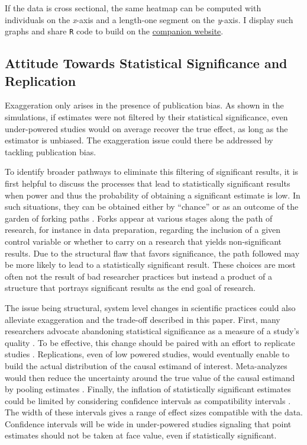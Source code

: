 \documentclass[usletter, 12pt]{article}
\begin{document}
				If the data is cross sectional, the same heatmap can be computed with individuals on the \textit{x}-axis and a length-one segment on the \textit{y}-axis. I display such graphs and share  \verb?R?  code to build on the \href{https://vincentbagilet.github.io/causal_exaggeration/}{companion website}.
				
				
	\subsection{Attitude Towards Statistical Significance and Replication}
	
		Exaggeration only arises in the presence of publication bias. As shown in the simulations, if estimates were not filtered by their statistical significance, even under-powered studies would on average recover the true effect, as long as the estimator is unbiased. The exaggeration issue could there be addressed by tackling publication bias. 
		
		To identify broader pathways to eliminate this filtering of significant results, it is first helpful to discuss the processes that lead to statistically significant results when power and thus the probability of obtaining a significant estimate is low. In such situations, they can be obtained either by ``chance'' or as an outcome of the garden of forking paths \citep{simmons_false-positive_2011, gelman_garden_2013, kasy_forking_2021}. Forks appear at various stages along the path of research, for instance in data preparation, regarding the inclusion of a given control variable or whether to carry on a research that yields non-significant results. Due to the structural flaw that favors significance, the path followed may be more likely to lead to a statistically significant result. These choices are most often not the result of bad researcher practices but instead a product of a structure that portrays significant results as the end goal of research. 
		
		The issue being structural, system level changes in scientific practices could also alleviate exaggeration and the trade-off described in this paper. First, many researchers advocate abandoning statistical significance as a measure of a study's quality \citep{mcshane_abandon_2019}. To be effective, this change should be paired with an effort to replicate studies \citep{christensen_transparency_2018}. Replications, even of low powered studies, would eventually enable to build the actual distribution of the causal estimand of interest. Meta-analyzes would then reduce the uncertainty around the true value of the causal estimand by pooling estimates \citep{hernan_causal_2021}. Finally, the inflation of statistically significant estimates could be limited by considering confidence intervals as compatibility intervals \citep{shadish_experimental_2002, amrhein_inferential_2019, romer_praise_2020}. The width of these intervals gives a range of effect sizes compatible with the data. Confidence intervals will be wide in under-powered studies signaling that point estimates should not be taken at face value, even if statistically significant.
\end{document}
